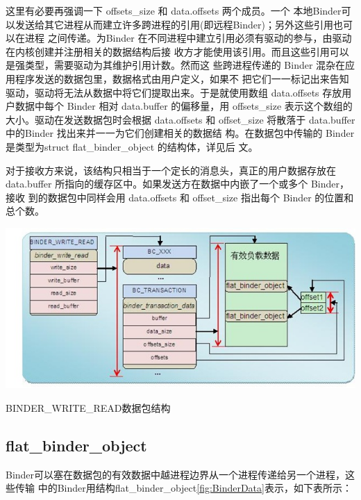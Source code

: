 \documentclass[a4paper,11pt]{article}
\begin{document}
这里有必要再强调一下 offsets_size 和 data.offsets 两个成员。一个
本地Binder可以发送给其它进程从而建立许多跨进程的引用(即远程Binder)；另外这些引用也可以在进程
之间传递。为Binder
在不同进程中建立引用必须有驱动的参与，由驱动在内核创建并注册相关的数据结构后接
收方才能使用该引用。而且这些引用可以是强类型，需要驱动为其维护引用计数。然而这
些跨进程传递的 Binder 混杂在应用程序发送的数据包里，数据格式由用户定义，如果不
把它们一一标记出来告知驱动，驱动将无法从数据中将它们提取出来。于是就使用数组
data.offsets 存放用户数据中每个 Binder 相对 data.buffer 的偏移量，用
offsets_size 表示这个数组的大小。驱动在发送数据包时会根据 data.offsets 和
offset_size 将散落于 data.buffer 中的Binder 找出来并一一为它们创建相关的数据结
构。在数据包中传输的 Binder 是类型为struct flat_binder_object 的结构体，详见后
文\label{BinderTransStructure}。

对于接收方来说，该结构只相当于一个定长的消息头，真正的用户数据存放在
data.buffer 所指向的缓存区中。如果发送方在数据中内嵌了一个或多个 Binder，接收
到的数据包中同样会用 data.offsets 和 offset_size 指出每个 Binder
的位置和总个数。

\begin{minipage}{0.9\linewidth}
\includegraphics[scale=0.66]{binderproto.jpg}

\caption{ BINDER_WRITE_READ数据包结构\label{fig:BinderData}}
\end{minipage}

\subsection{flat_binder_object}
Binder可以塞在数据包的有效数据中越进程边界从一个进程传递给另一个进程，这些传输
中的Binder用结构flat_binder_object\autoref{fig:BinderData}表示，如下表所示： 
\end{document}
